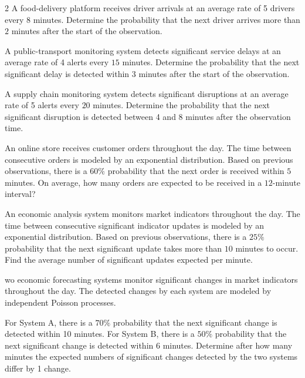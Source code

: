 \begin{multicols}{2}
		{
		A food-delivery platform receives driver arrivals at an
		average rate of 5 drivers every \(8\) minutes. Determine the probability that the next driver arrives more than
		\(2\) minutes after the start of the observation.
		}
	
		{
		A public-transport monitoring system detects significant service delays
		at an average rate of 4 alerts every \(15\) minutes. Determine the probability that the next significant delay is
		detected within \(3\) minutes after the start of the observation.
		}
		
		{
		A supply chain monitoring system detects significant disruptions at an
		average rate of 5 alerts every \(20\) minutes. Determine the probability that the next significant disruption is
		detected between 4 and 8 minutes after the observation time.
		}
		

		
		{
		An online store receives customer orders throughout the day. The time
		between consecutive orders is modeled by an exponential distribution.
		Based on previous observations, there is a \(60\%\) probability that the
		next order is received within \(5\) minutes. On average, how many orders
		are expected to be received in a \(12\)-minute interval?
		}
		
				\columnbreak
		
		{
		An economic analysis system monitors market indicators throughout the
		day. The time between consecutive significant indicator updates is
		modeled by an exponential distribution. Based on previous observations,
		there is a \(25\%\) probability that the next significant update takes
		more than \(10\) minutes to occur. Find the average number of significant
		updates expected per minute.
		}
		
		{
			wo economic forecasting systems monitor significant changes in market
			indicators throughout the day. The detected changes by each system are
			modeled by independent Poisson processes.
			
			For System A, there is a \(70\%\) probability that the next significant
			change is detected within 10 minutes. For System B, there is a \(50\%\)
			probability that the next significant change is detected within
			6 minutes. Determine after how many minutes the expected numbers of significant
			changes detected by the two systems differ by 1 change.
		}
		

\end{multicols}
